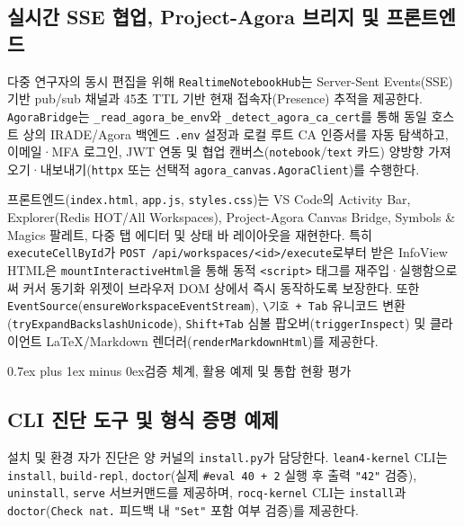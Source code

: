 \documentclass[journal]{IEEEtran}
\makeatletter
\def\section{\@startsection{section}{1}{\z@}{1.5ex plus 1.5ex minus 0.5ex}%
  {0.7ex plus 1ex minus 0ex}{\normalfont\normalsize\centering\bfseries}}%
\newcommand{\code}[1]{\texttt{#1}}
\makeatother
\begin{document}
\subsection{실시간 SSE 협업, Project-Agora 브리지 및 프론트엔드}
다중 연구자의 동시 편집을 위해 \code{RealtimeNotebookHub}는 Server-Sent Events(SSE) 기반 pub/sub 채널과 45초 TTL 기반 현재 접속자(Presence) 추적을 제공한다. \code{AgoraBridge}는 \code{\_read\_agora\_be\_env}와 \code{\_detect\_agora\_ca\_cert}를 통해 동일 호스트 상의 IRADE/Agora 백엔드 \code{.env} 설정과 로컬 루트 CA 인증서를 자동 탐색하고, 이메일·MFA 로그인, JWT 연동 및 협업 캔버스(\code{notebook}/\code{text} 카드) 양방향 가져오기·내보내기(\code{httpx} 또는 선택적 \code{agora\_canvas.AgoraClient})를 수행한다.

프론트엔드(\code{index.html}, \code{app.js}, \code{styles.css})는 VS Code의 Activity Bar, Explorer(Redis HOT/All Workspaces), Project-Agora Canvas Bridge, Symbols \& Magics 팔레트, 다중 탭 에디터 및 상태 바 레이아웃을 재현한다. 특히 \code{executeCellById}가 \code{POST /api/workspaces/<id>/execute}로부터 받은 InfoView HTML은 \code{mountInteractiveHtml}을 통해 동적 \code{<script>} 태그를 재주입·실행함으로써 커서 동기화 위젯이 브라우저 DOM 상에서 즉시 동작하도록 보장한다. 또한 \code{EventSource}(\code{ensureWorkspaceEventStream}), \code{\textbackslash 기호 + Tab} 유니코드 변환(\code{tryExpandBackslashUnicode}), \code{Shift+Tab} 심볼 팝오버(\code{triggerInspect}) 및 클라이언트 \LaTeX/Markdown 렌더러(\code{renderMarkdownHtml})를 제공한다.

\section{검증 체계, 활용 예제 및 통합 현황 평가}

\subsection{CLI 진단 도구 및 형식 증명 예제}
설치 및 환경 자가 진단은 양 커널의 \code{install.py}가 담당한다. \code{lean4-kernel} CLI는 \code{install}, \code{build-repl}, \code{doctor}(실제 \code{\#eval 40 + 2} 실행 후 출력 \code{"42"} 검증), \code{uninstall}, \code{serve} 서브커맨드를 제공하며, \code{rocq-kernel} CLI는 \code{install}과 \code{doctor}(\code{Check nat.} 피드백 내 \code{"Set"} 포함 여부 검증)를 제공한다.
\end{document}
